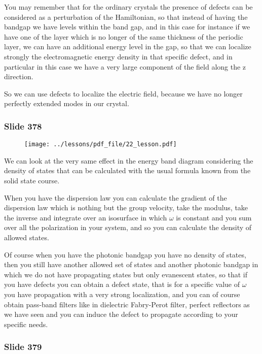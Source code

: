 \documentclass[../main/main.tex]{subfiles}
\begin{document}
You may remember that for the ordinary crystals the presence of defects can be considered as a perturbation of the Hamiltonian, so that instead of having the bandgap we have levels within the band gap, and in this case for instance if we have one of the layer which is no longer of the same thickness of the periodic layer, we can have an additional energy level in the gap, so that we can localize strongly the electromagnetic energy density in that specific defect, and in particular in this case we have a  very large component of the field along the z direction. 

So we can use defects to localize the electric field, because we have no longer perfectly extended modes in our crystal.

\newpage

\subsubsection{Slide 378}

\begin{figure}[h!]
\centering
\texttt{[image: ../lessons/pdf\_file/22\_lesson.pdf]}
\end{figure}

We can look at the very same effect in the energy band diagram considering the density of states that can be calculated with the usual formula known from the solid state course. 

When you have the dispersion law you can calculate the gradient of the dispersion law which is nothing but the group velocity, take the modulus, take the inverse and integrate over an isosurface in which $\omega$ is constant and you sum over all the polarization in your system, and so you can calculate the density of allowed states.

Of course when you have the photonic bandgap you have no density of states, then you still have another allowed set of states and another photonic bandgap in which we do not have propagating states but only evanescent states, so that if you have defects you can obtain a defect state, that is for a specific value of $\omega$ you have propagation with a very strong localization, and you can of course obtain pass-band filters like in dielectric Fabry-Perot filter, perfect reflectors as we have seen and you can induce the defect to propagate according to your specific needs.

\newpage

\subsubsection{Slide 379}
\end{document}
